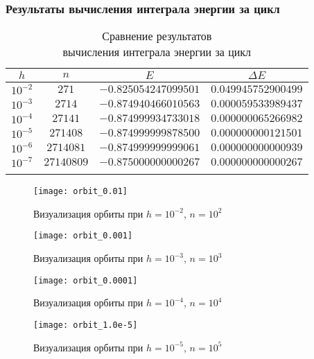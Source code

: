 \begin{frame}
\frametitle{Результаты вычисления интеграла энергии за цикл}

\begin{table}[h]
  \centering
  \caption{Сравнение результатов \\ вычисления интеграла энергии за цикл}
  \begin{tabular}{cccc}
    \toprule
    $ h $ &
    $ n $ &
    $ E $ &
    $ \Delta E $ \\
    \midrule
    $ 10^{-2} $ & $ 271 $ & $ -0.825054247099501 $ & $ 0.049945752900499 $ \\
    \arrayrulecolor{black!40}
    \midrule
    $ 10^{-3} $ & $ 2714 $ & $ -0.874940466010563 $ & $ 0.000059533989437 $ \\
    \midrule
    $ 10^{-4} $ & $ 27141 $ & $ -0.874999934733018 $ & $ 0.000000065266982 $ \\
    \midrule
    $ 10^{-5} $ & $ 271408 $ & $ -0.874999999878500 $ & $ 0.000000000121501 $ \\
    \midrule
    $ 10^{-6} $ & $ 2714081 $ & $ -0.874999999999061 $ & $ 0.000000000000939 $ \\
    \midrule
    $ 10^{-7} $ & $ 27140809 $ & $ -0.875000000000267 $ & $ 0.000000000000267 $ \\
    \arrayrulecolor{black}
    \bottomrule
  \end{tabular}
\end{table}

\end{frame}

\begin{frame}
\begin{figure}[h]
  \centering
  \texttt{[image: orbit\_0.01]}
  \caption{Визуализация орбиты при $ h = 10^{-2} $, $ n = 10^2 $}
\end{figure}
\end{frame}

\begin{frame}
\begin{figure}[h]
  \centering
  \texttt{[image: orbit\_0.001]}
  \caption{Визуализация орбиты при $ h = 10^{-3} $, $ n = 10^3 $}
\end{figure}
\end{frame}

\begin{frame}
\begin{figure}[h]
  \centering
  \texttt{[image: orbit\_0.0001]}
  \caption{Визуализация орбиты при $ h = 10^{-4} $, $ n = 10^4 $}
\end{figure}
\end{frame}

\begin{frame}
\begin{figure}[h]
  \centering
  \texttt{[image: orbit\_1.0e-5]}
  \caption{Визуализация орбиты при $ h = 10^{-5} $, $ n = 10^5 $}
\end{figure}
\end{frame}


